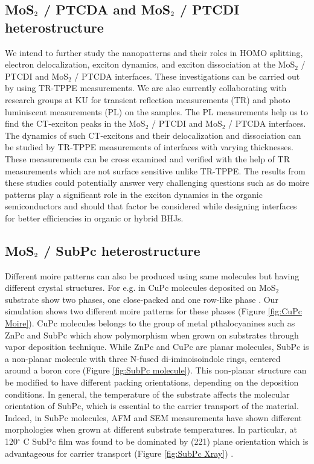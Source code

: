 \documentclass[12pt]{article}
\begin{document}
\subsection{MoS$\protect_2$ / PTCDA and MoS$\protect_2$ / PTCDI heterostructure}
 We intend to further study the nanopatterns and their roles in HOMO splitting, electron delocalization, exciton dynamics, and exciton dissociation at the MoS$_2$ / PTCDI and MoS$_2$ / PTCDA interfaces. These investigations can be carried out by using TR-TPPE measurements. We are also currently collaborating with research groups at KU for transient reflection measurements (TR) and photo luminiscent measurements (PL) on the samples. The PL measurements help us to find the CT-exciton peaks in the MoS$_2$ / PTCDI and MoS$_2$ / PTCDA interfaces. The dynamics of such CT-excitons and their delocalization and dissociation can be studied by TR-TPPE measurements of interfaces with varying thicknesses. These measurements can be cross examined and verified with the help of TR measurements which are not surface sensitive unlike TR-TPPE. The results from these studies could potentially answer very challenging questions such as do moire patterns play a significant role in the exciton dynamics in the organic semiconductors and should that factor be considered while designing interfaces for better efficiencies in organic or hybrid BHJs.

\subsection{MoS$\protect_2$ / SubPc heterostructure}
Different moire patterns can also be produced using same molecules but having different crystal structures. For e.g. in CuPc molecules deposited on MoS$_2$ substrate show two phases, one close-packed and one row-like phase \cite{ludwig1994epitaxy}. Our simulation shows two different moire patterns for these phases (Figure \ref{fig:CuPc Moire}). CuPc molecules belongs to the group of metal pthalocyanines such as ZnPc and SubPc which show polymorphism when grown on substrates through vapor deposition technique. While ZnPc and CuPc are planar molecules, SubPc is a non-planar molecule with three N-fused di-iminoisoindole rings, centered around a boron core (Figure \ref{fig:SubPc molecule}). This non-planar structure can be modified to have different packing orientations, depending on the deposition conditions. In general, the temperature of the substrate affects the molecular orientation of SubPc, which is essential to the carrier transport of the material. Indeed, in SubPc molecules, AFM and SEM measurements have shown different morphologies when grown at different substrate temperatures. In particular, at 120$^\circ$ C SubPc film was found to be dominated by (221) plane orientation which is advantageous for carrier transport (Figure \ref{fig:SubPc Xray}) \cite{chou2012effect}.
\end{document}
